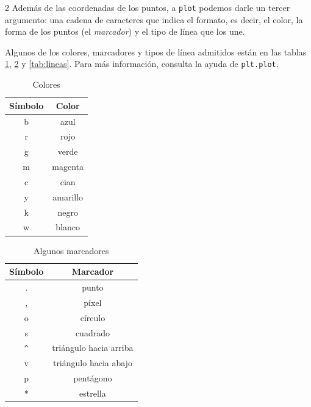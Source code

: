\begin{paracol}{2}
Además de las coordenadas de los puntos, a \texttt{plot} podemos darle un tercer argumento: una cadena de caracteres que indica el formato, es decir, el color, la forma de los puntos (el \emph{marcador}) y el tipo de línea que los une.

Algunos de los colores, marcadores y tipos de línea admitidos están en las tablas \ref{tab:colores}, \ref{tab:puntos} y \ref{tab:lineas}. Para más información, consulta la ayuda de \texttt{plt.plot}.

    \begin{table}
        \centering
        \begin{tabular}{|c|c|} \hline
        \textbf{Símbolo}     &  \textbf{Color}\\ \hline
             b& azul \\ \hline
             r& rojo \\ \hline
             g& verde \\ \hline
             m& magenta\\ \hline
             c& cian\\ \hline
             y& amarillo\\ \hline
             k& negro\\ \hline
             w& blanco\\ \hline
        \end{tabular}
        \caption{Colores}
        \label{tab:colores}
    \end{table}

    \begin{table}
        \centering
        \begin{tabular}{|c|c|} \hline
        \textbf{Símbolo}     &  \textbf{Marcador}\\ \hline
             .& punto \\ \hline
             ,& píxel\\ \hline
             o& círculo \\ \hline
             s& cuadrado\\ \hline
             \texttt{\^{}} & triángulo hacia arriba\\ \hline
             v& triángulo hacia abajo\\ \hline
             p& pentágono\\ \hline
             *& estrella\\ \hline
        \end{tabular}
        \caption{Algunos marcadores}
        \label{tab:puntos}
    \end{table}


\end{paracol}
